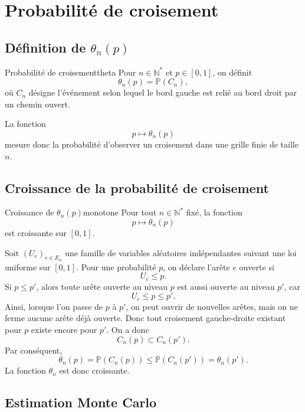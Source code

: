 \documentclass[11pt,a4paper]{report}
\newenvironment{proofbox}
{\begin{tcolorbox}[colback=grisclair,colframe=black!25,title=\textbf{Démonstration},fonttitle=\bfseries,sharp corners,boxrule=0.6pt]}
{\end{tcolorbox}}
\newcommand{\N}{\mathbb{N}}
\newcommand{\Pbb}{\mathbb{P}}
\begin{document}
\chapter{Probabilité de croisement}

\section{Définition de \texorpdfstring{$\theta_n(p)$}{theta n p}}

\begin{definitionbox}{Probabilité de croisement}{theta}
Pour $n\in\N^*$ et $p\in[0,1]$, on définit
\[
\theta_n(p)=\Pbb(C_n),
\]
où $C_n$ désigne l'événement selon lequel le bord gauche est relié au bord droit par un chemin ouvert.
\end{definitionbox}

La fonction
\[
p\longmapsto \theta_n(p)
\]
mesure donc la probabilité d'observer un croisement dans une grille finie de taille $n$.

\section{Croissance de la probabilité de croisement}

\begin{theorembox}{Croissance de $\theta_n(p)$}{monotone}
Pour tout $n\in\N^*$ fixé, la fonction
\[
p\longmapsto \theta_n(p)
\]
est croissante sur $[0,1]$.
\end{theorembox}

\begin{proofbox}
Soit $(U_e)_{e\in E_n}$ une famille de variables aléatoires indépendantes suivant une loi uniforme sur $[0,1]$. Pour une probabilité $p$, on déclare l'arête $e$ ouverte si
\[
U_e\leq p.
\]
Si $p\leq p'$, alors toute arête ouverte au niveau $p$ est aussi ouverte au niveau $p'$, car
\[
U_e\leq p\leq p'.
\]
Ainsi, lorsque l'on passe de $p$ à $p'$, on peut ouvrir de nouvelles arêtes, mais on ne ferme aucune arête déjà ouverte. Donc tout croisement gauche-droite existant pour $p$ existe encore pour $p'$. On a donc
\[
C_n(p)\subset C_n(p').
\]
Par conséquent,
\[
\theta_n(p)=\Pbb(C_n(p))\leq \Pbb(C_n(p'))=\theta_n(p').
\]
La fonction $\theta_n$ est donc croissante.
\end{proofbox}

\section{Estimation Monte Carlo}
\end{document}
